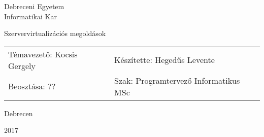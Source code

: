 \documentclass{memoir}
\begin{document}
\Large
\begin{center}
Debreceni Egyetem\\
Informatikai Kar
\end{center}

\vspace*{\fill}
\begin{vplace}[0.9]
\begin{center}
\HUGE
Szervervirtualizációs megoldások
\end{center}
\end{vplace}

\Large
\begin{tabu} to \linewidth{ X[l] X[r] }
Témavezető: Kocsis Gergely &  Készítette: Hegedűs Levente \\
Beosztása: ?? & Szak: Programtervező Informatikus MSc \\
\end{tabu}

\vspace*{100pt}
\LARGE{
\begin{center}
Debrecen

2017
\end{center}
}
\end{document}
